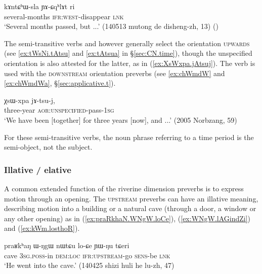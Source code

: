 \begin{exe}
\ex \label{ex:kAntChWsla.YACqhlAt}
\gll kɤntɕʰɯ-sla ɲɤ-ɕqʰlɤt ri \\
several-months \textsc{ifr}:\textsc{west}-disappear \textsc{lnk} \\
\glt `Several months passed, but ...' (140513 mutong de disheng-zh, 13) ()
\end{exe}

The semi-transitive verbs  and  however generally select the orientation \textsc{upwards} (see \ref{ex:tWsNi.tAtsu} and \ref{ex:tAtsua} in §\ref{sec:CN.time}),  though the unspecified orientation is also attested for the latter, as in (\ref{ex:XsWxpa.jAtsuj}).   The verb  is used with the \textsc{downstream} orientation preverbs (see \ref{ex:chWmdW} and \ref{ex:chWmdWa}, §\ref{sec:applicative.t}).

\begin{exe}
\ex \label{ex:XsWxpa.jAtsuj}
\gll χsɯ-xpa jɤ-tsu-j, \\
three-year \textsc{aor}:\textsc{unspecified}-pass-\textsc{1sg} \\
\glt `We have been [together] for three years [now], and ...' (2005 Norbzang, 59)
\end{exe}
 
For these semi-transitive verbs, the noun phrase referring to a time period is the semi-object, not the subject.

\subsubsection{Illative / elative} \label{sec:illative.elative}
A common extended function of the riverine dimension preverbs is to express motion through an opening. The \textsc{upstream} preverbs can have an illative meaning, describing motion into a building or a natural cave (through a door, a window or any other opening) as in (\ref{ex:praRkhaN.WNgW.loCe}), (\ref{ex:WNgW.lAGindZi}) and (\ref{ex:kWm.losthoR}).

\begin{exe}
\ex \label{ex:praRkhaN.WNgW.loCe}
\gll  praʁkʰaŋ ɯ-ŋgɯ nɯtɕu lo-ɕe ɲɯ-ŋu tɕeri \\
cave \textsc{3sg}.\textsc{poss}-in \textsc{dem}:\textsc{loc} \textsc{ifr}:\textsc{upstream}-go \textsc{sens}-be \textsc{lnk} \\
\glt `He went into the cave.' (140425 shizi huli he lu-zh, 47)
\end{exe}

